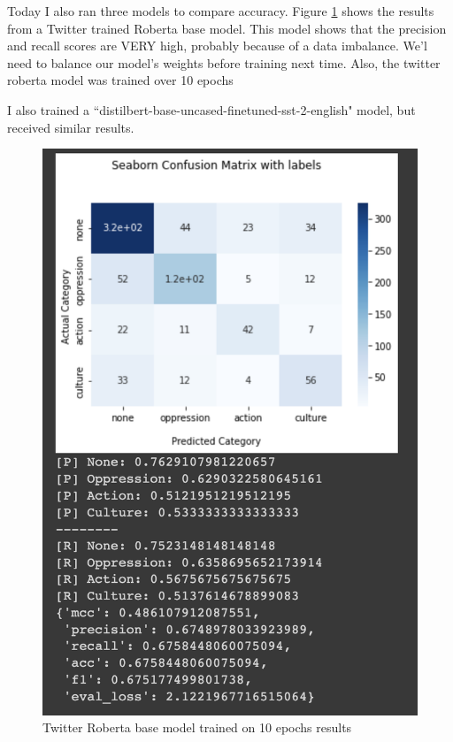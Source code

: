 \documentclass[11pt,letterpaper]{article}
\begin{document}
Today I also ran three models to compare accuracy. Figure \ref{fig:twitter_roberta} shows the results from a Twitter trained Roberta base model. This model shows that the precision and recall scores are VERY high, probably because of a data imbalance. We'l need to balance our model's weights before training next time. Also, the twitter roberta model was trained over 10 epochs

I also trained a ``distilbert-base-uncased-finetuned-sst-2-english" model, but received similar results.

\begin{figure}[!hbt]
    \centering
    \includegraphics[scale=0.3]{images/twitter_roberta.png}
    \caption{Twitter Roberta base model trained on 10 epochs results}
    \label{fig:twitter_roberta}
\end{figure}
\end{document}

